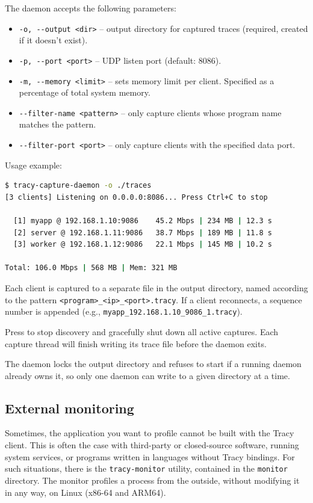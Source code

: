 \documentclass[hidelinks,titlepage,a4paper,twoside]{article}
\begin{document}
The daemon accepts the following parameters:

\begin{itemize}
\item \texttt{-o, -{}-output <dir>} -- output directory for captured traces (required, created if it doesn't exist).
\item \texttt{-p, -{}-port <port>} -- UDP listen port (default: 8086).
\item \texttt{-m, -{}-memory <limit>} -- sets memory limit per client. Specified as a percentage of total system memory.
\item \texttt{-{}-filter-name <pattern>} -- only capture clients whose program name matches the pattern.
\item \texttt{-{}-filter-port <port>} -- only capture clients with the specified data port.
\end{itemize}

Usage example:

\begin{lstlisting}[language=sh]
$ tracy-capture-daemon -o ./traces
[3 clients] Listening on 0.0.0.0:8086... Press Ctrl+C to stop

  [1] myapp @ 192.168.1.10:9086    45.2 Mbps | 234 MB | 12.3 s
  [2] server @ 192.168.1.11:9086   38.7 Mbps | 189 MB | 11.8 s
  [3] worker @ 192.168.1.12:9086   22.1 Mbps | 145 MB | 10.2 s

Total: 106.0 Mbps | 568 MB | Mem: 321 MB
\end{lstlisting}

Each client is captured to a separate file in the output directory, named according to the pattern \texttt{<program>\_<ip>\_<port>.tracy}. If a client reconnects, a sequence number is appended (e.g., \texttt{myapp\_192.168.1.10\_9086\_1.tracy}).

Press  to stop discovery and gracefully shut down all active captures. Each capture thread will finish writing its trace file before the daemon exits.

The daemon locks the output directory and refuses to start if a running daemon already owns it, so only one daemon can write to a given directory at a time.

\subsection{External monitoring}
\label{externalmonitoring}

Sometimes, the application you want to profile cannot be built with the Tracy client. This is often the case with third-party or closed-source software, running system services, or programs written in languages without Tracy bindings. For such situations, there is the \texttt{tracy-monitor} utility, contained in the \texttt{monitor} directory. The monitor profiles a process from the outside, without modifying it in any way, on Linux (x86-64 and ARM64).
\end{document}
